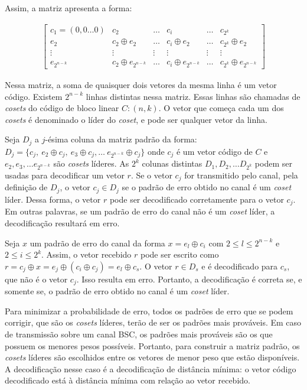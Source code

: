 Assim, a matriz apresenta a forma:

\begin{align*}
\left[\begin{array}{cccccc}
c_1=(0,0 \ldots 0) & c_2 & \ldots & c_i & \ldots & c_{2^k}\\
e_2 & c_2 \oplus e_2 & \ldots & c_i \oplus e_2 & \ldots & c_{2^k} \oplus e_2\\
\vdots & \vdots & \vdots & \vdots & \vdots & \vdots\\
e_{2^{n-k}} & c_2 \oplus e_{2^{n-k}} & \ldots & c_i \oplus e_{2^{n-k}} & \ldots & c_{2^k} \oplus e_{2^{n-k}}
\end{array}\right]
\end{align*}

Nessa matriz, a soma de quaisquer dois vetores da mesma linha é um vetor código. Existem  $2^{n-k}$ linhas distintas nessa matriz. Essas linhas são chamadas de \emph{cosets} do código de bloco linear $C:(n,k)$. O vetor que começa cada um dos \emph{cosets} é denominado o líder do \emph{coset}, e pode ser qualquer vetor da linha.

Seja $D_j$ a $j$-ésima coluna da matriz padrão da forma: $D_j=\{ c_j,\ e_2 \oplus c_j,\ e_3 \oplus c_j, \ldots\ e_{2^{n-k}} \oplus c_j\}$ onde $c_j$ é um vetor código de $C$ e $e_2, e_3, \ldots e_{2^{n-k}}$ são \emph{cosets} líderes. As $2^k$ colunas distintas $D_1, D_2, \ldots D_{2^{k}}$ podem ser usadas para decodificar um vetor $r$. Se o vetor $c_j$ for transmitido pelo canal, pela definição de $D_j$, o vetor $c_j \in D_j$ se o padrão de erro obtido no canal é um \emph{coset} líder. Dessa forma, o vetor $r$ pode ser decodificado corretamente para o vetor $c_j$. Em outras palavras, se um padrão de erro do canal não é um \emph{coset} líder, a decodificação resultará em erro.

Seja $x$ um padrão de erro do canal da forma $x=e_l \oplus c_i$ com $2 \leq l \leq 2^{n-k}$ e $2 \leq i \leq 2^k$. Assim, o vetor recebido $r$ pode ser escrito como $r=c_j \oplus x=e_j \oplus (c_i \oplus c_j)=e_l \oplus c_s$. O vetor $r \in D_s$ e é decodificado para $c_s$, que não é o vetor $c_j$. Isso resulta em erro. Portanto, a decodificação é correta se, e somente se, o padrão de erro obtido no canal é um \emph{coset} líder.

Para minimizar a probabilidade de erro, todos os padrões de erro que se podem corrigir, que são os \emph{cosets} líderes, terão de ser os padrões mais prováveis. Em caso de transmissão sobre um canal BSC, os padrões mais prováveis são os que possuem os menores pesos possíveis. Portanto, para construir a matriz padrão, os \emph{cosets} líderes são escolhidos entre os vetores de menor peso que estão disponíveis. A decodificação nesse caso é a decodificação de distância mínima: o vetor código decodificado está à distância mínima com relação ao vetor recebido.

